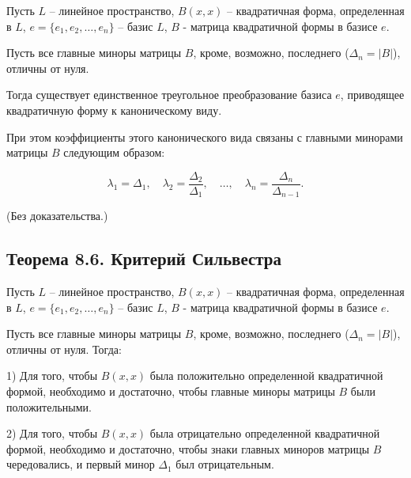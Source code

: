 {Пусть \( L \) – линейное пространство, \( B(x, x) \) – квадратичная форма, определенная в \( L \), \( e = \{e_1, e_2, \ldots, e_n\} \) – базис \( L \), \( B \) - матрица квадратичной формы в базисе \( e \).

Пусть все главные миноры матрицы \( B \), кроме, возможно, последнего (\( \Delta_n = |B| \)), отличны от нуля.

Тогда существует единственное треугольное преобразование базиса \( e \), приводящее квадратичную форму к каноническому виду.

При этом коэффициенты этого канонического вида связаны с главными минорами матрицы \( B \) следующим образом:



\[
\lambda_1 = \Delta_1, \quad \lambda_2 = \frac{\Delta_2}{\Delta_1}, \quad \dots, \quad \lambda_n = \frac{\Delta_n}{\Delta_{n-1}}.
\]



(Без доказательства.)

\subsection*{Теорема 8.6. Критерий Сильвестра}

Пусть \( L \) – линейное пространство, \( B(x, x) \) – квадратичная форма, определенная в \( L \), \( e = \{e_1, e_2, \ldots, e_n\} \) – базис \( L \), \( B \) - матрица квадратичной формы в базисе \( e \).

Пусть все главные миноры матрицы \( B \), кроме, возможно, последнего (\( \Delta_n = |B| \)), отличны от нуля. Тогда:

1) Для того, чтобы \( B(x, x) \) была положительно определенной квадратичной формой, необходимо и достаточно, чтобы главные миноры матрицы \( B \) были положительными.

2) Для того, чтобы \( B(x, x) \) была отрицательно определенной квадратичной формой, необходимо и достаточно, чтобы знаки главных миноров матрицы \( B \) чередовались, и первый минор \( \Delta_1 \) был отрицательным.



}